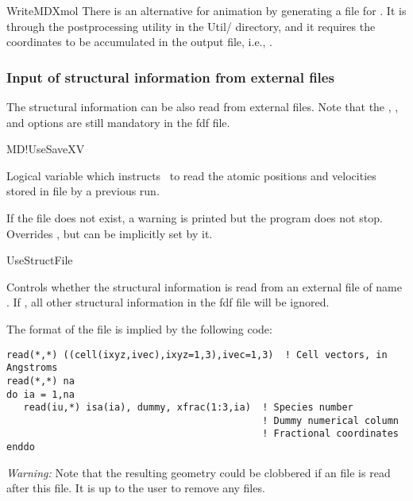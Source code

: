 \begin{itemize}
\begin{fdflogicalF}{WriteMDXmol}
    There is an alternative for animation by generating a  file for
    . It is through the
     postprocessing
    utility in the Util/ directory, and it 
    requires the coordinates to be accumulated in the output file, i.e.,
     \fdftrue.

  \end{fdflogicalF}

\end{itemize}



\subsubsection{Input of structural information from external files}

The structural information can be also read from external files. Note
that the , , and 
options are still mandatory in the fdf file.

\begin{fdflogicalF}{MD!UseSaveXV}

  Logical variable which instructs \siesta\ to read the atomic
  positions and velocities stored in file  by a previous
  run.
  
  If the file does not exist, a warning is printed but the
  program does not stop. Overrides , but can be
  implicitly set by it.

\end{fdflogicalF}

\begin{fdflogicalF}{UseStructFile}

  Controls whether the structural information is read from an external
  file of name . If \fdftrue, all other
  structural information in the fdf file will be ignored.

  The format of the file is implied by the following code:
\begin{verbatim}
read(*,*) ((cell(ixyz,ivec),ixyz=1,3),ivec=1,3)  ! Cell vectors, in Angstroms
read(*,*) na
do ia = 1,na
   read(iu,*) isa(ia), dummy, xfrac(1:3,ia)  ! Species number
                                             ! Dummy numerical column
                                             ! Fractional coordinates
enddo
\end{verbatim}
  
  \textit{Warning:} Note that the resulting geometry could be clobbered if
  an  file is read after this file. It is up to the user to remove
  any  files.
  
\end{fdflogicalF}

